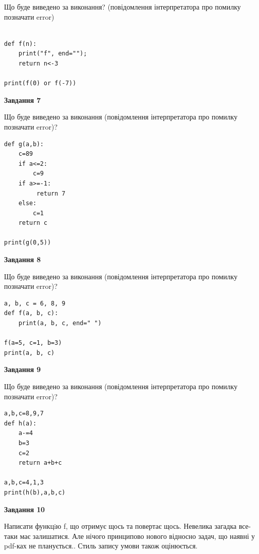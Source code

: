 \documentclass[12pt, ukrainian]{article}
\begin{document}
{\begin {large}
Що буде виведено за виконання? (повідомлення інтерпретатора про помилку позначати error)\par
\begin{verbatim}

def f(n):
    print("f", end="");
    return n<-3

print(f(0) or f(-7))
\end{verbatim}

{\begin {center}\textbf{Завдання 7}\end {center}}

Що буде виведено за виконання (повідомлення інтерпретатора про помилку позначати error)?\par
\begin{verbatim}
def g(a,b):
    c=89
    if a<=2:
        c=9
    if a>=-1:
         return 7
    else: 
        c=1
    return c

print(g(0,5))
\end{verbatim}

{\begin {center}\textbf{Завдання 8}\end {center}}

Що буде виведено за виконання (повідомлення інтерпретатора про помилку позначати error)?\par
\begin{verbatim}
a, b, c = 6, 8, 9
def f(a, b, c):
    print(a, b, c, end=" ")

f(a=5, c=1, b=3)
print(a, b, c)
\end{verbatim}

{\begin {center}\textbf{Завдання 9}\end {center}}

Що буде виведено за виконання (повідомлення інтерпретатора про помилку позначати error)?\par
\begin{verbatim}
a,b,c=8,9,7
def h(a):
    a-=4
    b=3
    c=2
    return a+b+c

a,b,c=4,1,3
print(h(b),a,b,c)
\end{verbatim}

{\begin {center}\textbf{Завдання 10}\end {center}}


Написати функцiю f, що отримує щось та повертає щось. Невелика загадка все-таки має залишатися. Але нічого принципово нового відносно задач, що наявні у pdf-ках не планується.. Стиль запису умови також оцінюється.\par
\end {large}}
\newpage
\end{document}
